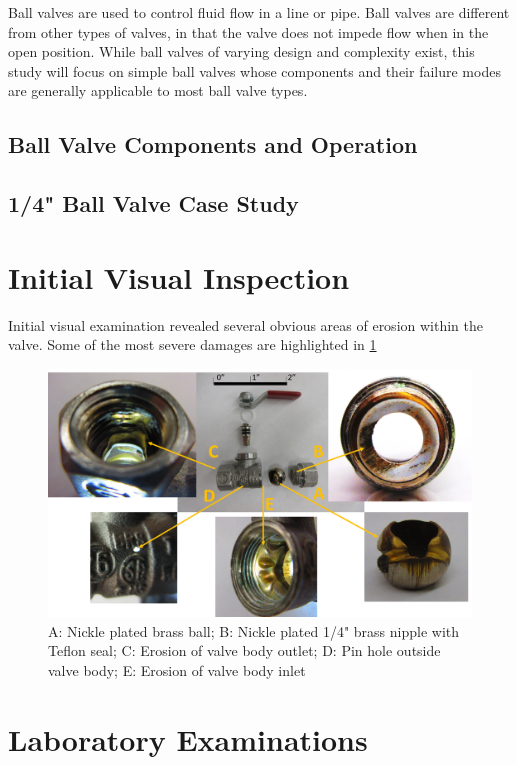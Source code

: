 \documentclass[]{article}
\begin{document}
Ball valves are used to control fluid flow in a line or pipe. Ball valves are different from other types of valves, in that the valve does not impede flow when in the open position. While ball valves of varying design and complexity exist, this study will focus on simple ball valves whose components and their failure modes are generally applicable to most ball valve types.

\subsection{Ball Valve Components and Operation}




\subsection{1/4" Ball Valve Case Study}



\section{Initial Visual Inspection}
Initial visual examination revealed several obvious areas of erosion within the valve. Some of the most severe damages are highlighted in  \ref{fig:Ball Valve as Recieved} 

\begin{figure}[htbp]
	\centering
	\includegraphics[width=0.9\linewidth]{Photos/Exploded_Callouts}
	\caption{A: Nickle plated brass ball; B: Nickle plated 1/4" brass nipple with Teflon seal; C: Erosion of valve body outlet; D: Pin hole outside valve body; E: Erosion of valve body inlet}
	\label{fig:Ball Valve as Recieved}
\end{figure}

\section{Laboratory Examinations}
\end{document}
